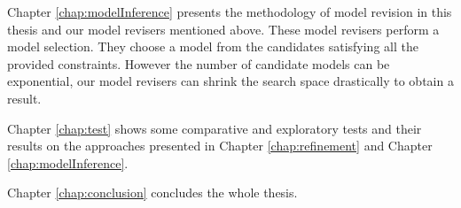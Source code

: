 Chapter \ref{chap:modelInference} presents the methodology of model revision in this thesis and our model revisers mentioned above.
These model revisers perform a model selection. 
They choose a model from the candidates satisfying all the provided constraints.
However the number of candidate models can be exponential, our model revisers can shrink the search space drastically to obtain a result.

Chapter \ref{chap:test} shows some comparative and exploratory tests and their results on the approaches presented in Chapter \ref{chap:refinement} and Chapter \ref{chap:modelInference}.

Chapter \ref{chap:conclusion} concludes the whole thesis.